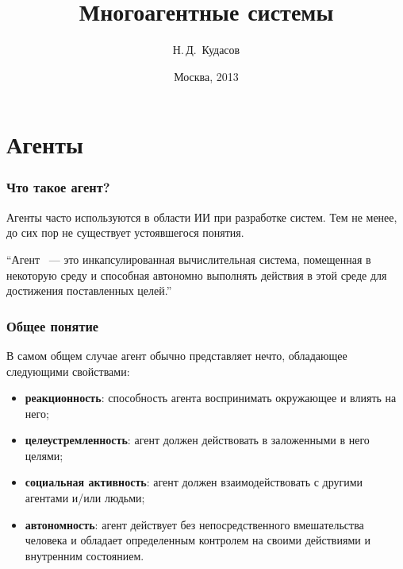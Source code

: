 \documentclass{beamer}
\begin{document}
\title[]{Многоагентные системы}
\author{Н.\,Д.~Кудасов}

\institute{
    \vspace{2.0cm}
}
\date{Москва, 2013}

\begin{frame}
\addtocounter{framenumber}{-1}
\maketitle
\end{frame}

\section{Агенты}

\begin{frame}
\frametitle{Что такое агент?}
  Агенты часто используются в области ИИ при разработке систем.
  Тем не менее, до сих пор не существует устоявшегося понятия.

  \begin{exampleblock}{}
    {\large ``Агент ~--- это инкапсулированная вычислительная система,
    помещенная в некоторую среду и способная автономно выполнять действия
    в этой среде для достижения поставленных целей.''}
    \vskip5mm
    \hspace*{}
  \end{exampleblock}

\end{frame}

\begin{frame}
\frametitle{Общее понятие}
  В самом общем случае агент обычно представляет нечто, обладающее
  следующими свойствами:

  \begin{itemize}
    \item<1-> {\bf реакционность}: способность агента воспринимать окружающее и влиять на него;
    \item<2-> {\bf целеустремленность}: агент должен действовать в заложенными в него целями;
    \item<3-> {\bf социальная активность}: агент должен взаимодействовать с другими агентами и/или людьми;
    \item<4-> {\bf автономность}: агент действует без непосредственного вмешательства человека и обладает
      определенным контролем на своими действиями и внутренним состоянием.
  \end{itemize}
\end{frame}
\end{document}

